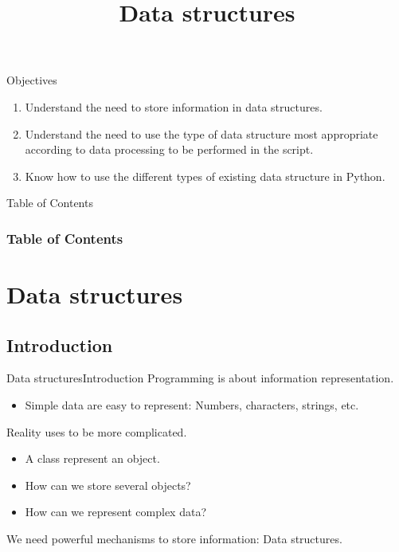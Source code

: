 \documentclass[10pt,compress]{beamer} %
\title[Data structures]{Data structures}
\author{}
\institute{\asignatura}
\date{}
\begin{document}
{\titlepageBlue
    \begin{frame}
        \titlepage
    \end{frame}
}

\begin{frame}[plain]{}
	\begin{block}{Objectives}
		\begin{enumerate}
		\item Understand the need to store information in data structures.
		\item Understand the need to use the type of data structure most appropriate according to data processing to be performed in the script.
		\item Know how to use the different types of existing data structure in Python.
		\end{enumerate}
	\end{block}
\end{frame}

{
\eliminarNavegacion
\begin{frame}[shrink]{Table of Contents}
 \frametitle{Table of Contents}
 \tableofcontents
\end{frame}
}

\section{Data structures}
\subsection{Introduction}
\begin{frame}{Data structures}{Introduction}
	Programming is about information representation.
	\begin{itemize}
		\item Simple data are easy to represent: Numbers, characters, strings, etc.
	\end{itemize}
	Reality uses to be more complicated.
	\begin{itemize}
		\item A class represent an object.
		\item How can we store several objects?
		\item How can we represent complex data?
	\end{itemize}
	We need powerful mechanisms to store information: Data structures.
\end{frame}
\end{document}
